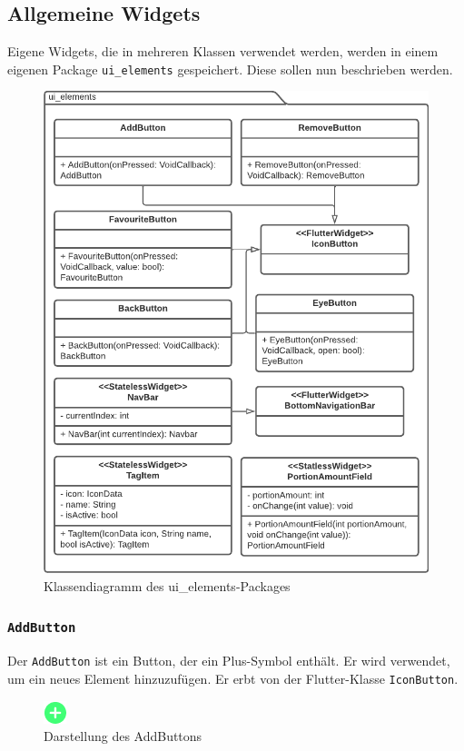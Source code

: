 \documentclass{entwurfsheft}
\begin{document}
\subsection{Allgemeine Widgets}
Eigene Widgets, die in mehreren Klassen verwendet werden, werden in einem eigenen Package \texttt{ui\_elements} gespeichert. Diese sollen nun beschrieben werden.
\begin{figure}[htp]
    \centering
    \includegraphics[height = .5\textheight]{images/presentationLayer/classDiagrams/uiElementsWhole.pdf}
    \caption{Klassendiagramm des ui\_elements-Packages}
    \label{fig:ui-elements}
\end{figure}

\subsubsection{\texttt{AddButton}}
\label{sec:addButton}
Der \texttt{AddButton} ist ein Button, der ein Plus-Symbol enthält. Er wird verwendet, um ein neues Element hinzuzufügen. Er erbt von der Flutter-Klasse \texttt{IconButton}.
\begin{figure}[htp]
    \centering
    \includegraphics[height = .5cm]{images/presentationLayer/uiElements/addButton.png}
    \caption{Darstellung des AddButtons}
\end{figure}
\end{document}
